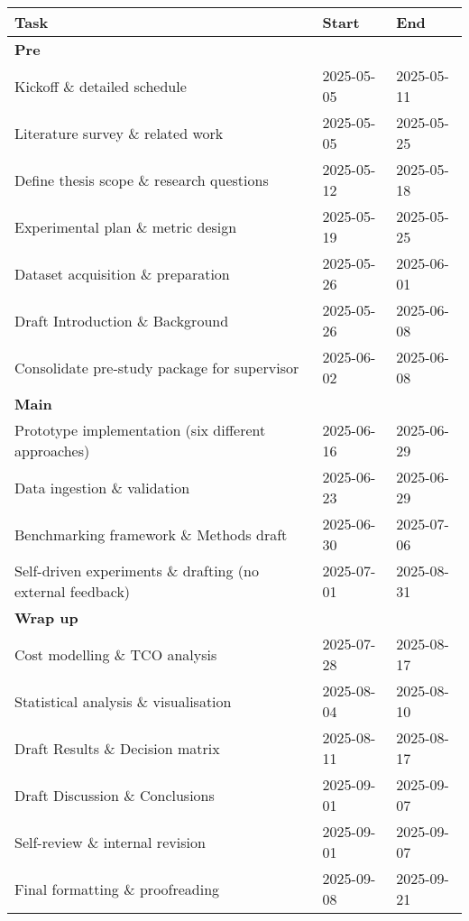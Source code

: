 \documentclass{article}
\begin{document}
\begin{center}
    \begingroup
        \setlength{\tabcolsep}{8pt}
        \small
        \begin{tabular}{@{}lll@{}}
            \toprule
            \textbf{Task} & \textbf{Start} & \textbf{End} \\
            \midrule
            \multicolumn{3}{l}{\textbf{Pre}} \\
            Kickoff \& detailed schedule & 2025-05-05 & 2025-05-11 \\
            Literature survey \& related work & 2025-05-05 & 2025-05-25 \\
            Define thesis scope \& research questions & 2025-05-12 & 2025-05-18 \\
            Experimental plan \& metric design & 2025-05-19 & 2025-05-25 \\
            Dataset acquisition \& preparation & 2025-05-26 & 2025-06-01 \\
            Draft Introduction \& Background & 2025-05-26 & 2025-06-08 \\
            Consolidate pre-study package for supervisor & 2025-06-02 & 2025-06-08 \\
            \midrule
            \multicolumn{3}{l}{\textbf{Main}} \\
            Prototype implementation (six different approaches) & 2025-06-16 & 2025-06-29 \\
            Data ingestion \& validation & 2025-06-23 & 2025-06-29 \\
            Benchmarking framework \& Methods draft & 2025-06-30 & 2025-07-06 \\
            Self-driven experiments \& drafting (no external feedback) & 2025-07-01 & 2025-08-31 \\
            \midrule
            \multicolumn{3}{l}{\textbf{Wrap up}} \\
            Cost modelling \& TCO analysis & 2025-07-28 & 2025-08-17 \\
            Statistical analysis \& visualisation & 2025-08-04 & 2025-08-10 \\
            Draft Results \& Decision matrix & 2025-08-11 & 2025-08-17 \\
            Draft Discussion \& Conclusions & 2025-09-01 & 2025-09-07 \\
            Self-review \& internal revision & 2025-09-01 & 2025-09-07 \\
            Final formatting \& proofreading & 2025-09-08 & 2025-09-21 \\
            \bottomrule
        \end{tabular}
    \endgroup
\end{center}



\printbibliography
\end{document}
